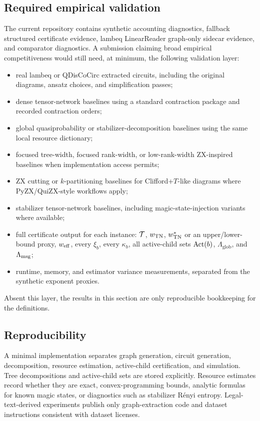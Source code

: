 \subsection{Required empirical validation}

The current repository contains synthetic accounting diagnostics, fallback structured certificate evidence, lambeq LinearReader graph-only sidecar evidence, and comparator diagnostics. A submission claiming broad empirical competitiveness would still need, at minimum, the following validation layer:
\begin{itemize}[leftmargin=1.2cm]
\item real lambeq or QDisCoCirc extracted circuits, including the original diagrams, ansatz choices, and simplification passes;
\item dense tensor-network baselines using a standard contraction package and recorded contraction orders;
\item global quasiprobability or stabilizer-decomposition baselines using the same local resource dictionary;
\item focused tree-width, focused rank-width, or low-rank-width ZX-inspired baselines when implementation access permits;
\item ZX cutting or \(k\)-partitioning baselines for Clifford+\(T\)-like diagrams where PyZX/QuiZX-style workflows apply;
\item stabilizer tensor-network baselines, including magic-state-injection variants where available;
\item full certificate output for each instance: \(\mathcal{T}\), \(w_{\mathrm{TN}}\), \(w_{\mathrm{TN}}^\ast\) or an upper/lower-bound proxy, \(w_{\mathrm{eff}}\), every \(\xi_b\), every \(\kappa_b\), all active-child sets \(\operatorname{Act}(b)\), \(\Lambda_{\mathrm{glob}}\), and \(\Lambda_{\mathrm{msg}}\);
\item runtime, memory, and estimator variance measurements, separated from the synthetic exponent proxies.
\end{itemize}
Absent this layer, the results in this section are only reproducible bookkeeping for the definitions.

\subsection{Reproducibility}

A minimal implementation separates graph generation, circuit generation, decomposition, resource estimation, active-child certification, and simulation. Tree decompositions and active-child sets are stored explicitly. Resource estimates record whether they are exact, convex-programming bounds, analytic formulas for known magic states, or diagnostics such as stabilizer R\'enyi entropy. Legal-text-derived experiments publish only graph-extraction code and dataset instructions consistent with dataset licenses.

